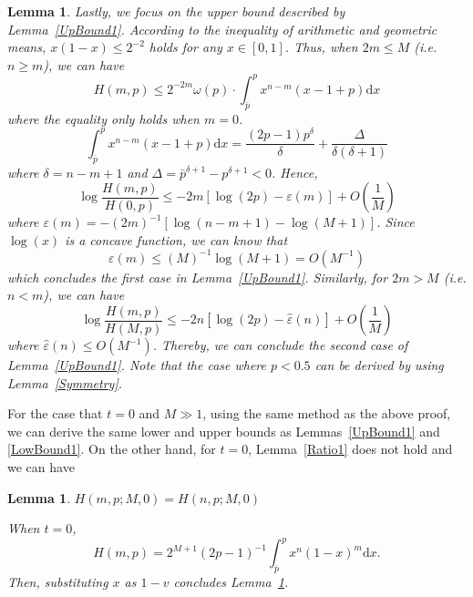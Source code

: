 \documentclass{article}
\makeatletter
\newcounter{lemmas}
\newtheorem{lemma}[lemmas]{Lemma}
\renewenvironment{proof}[1][\proofname]{\par
  \vspace{-\topsep}%
  \pushQED{\qed}%
  \normalfont
  \topsep0pt \partopsep0pt %
  \trivlist
  \item[\hskip\labelsep
        \itshape
    #1\@addpunct{.}]\ignorespaces
}{%
  \popQED\endtrivlist\@endpefalse
  \addvspace{0pt plus 0pt} %
}
\makeatother
\begin{document}
\begin{lemma}
\begin{proof}
Lastly, we focus on the upper bound described by Lemma~\ref{UpBound1}. According to the inequality of arithmetic and geometric means, $x(1-x)\leq 2^{-2}$ holds for any $x\in [0,1]$. Thus, when $2m\leq M$ (i.e. $n\geq m$), we can have
\begin{equation}
H(m,p)\leq 2^{-2m}\omega(p)\cdot \int_{\bar{p}}^{p}x^{n-m}(x-1+p)\mathrm{d}x
\end{equation}
where the equality only holds when $m=0$.
\begin{equation}
 \int_{\bar{p}}^{p}x^{n-m}(x-1+p)\mathrm{d}x=\frac{(2p-1)p^{\delta}}{\delta}+\frac{\Delta}{\delta(\delta+1)}
\end{equation}
where $\delta=n-m+1$ and $\Delta=\bar{p}^{\delta+1}-p^{\delta+1}<0$. Hence,
\begin{equation}
\log\frac{H(m,p)}{H(0,p)}\leq -2m[\log(2p)-\varepsilon(m)] + O\left(\frac{1}{M}\right)
\end{equation}
where $\varepsilon(m)=-(2m)^{-1}[\log(n-m+1)-\log(M+1)]$. Since $\log(x)$ is a concave function, we can know that
\begin{equation}
\varepsilon(m)\leq (M)^{-1}\log(M+1)=O\left(M^{-1}\right)
\end{equation}
which concludes the first case in Lemma~\ref{UpBound1}. Similarly, for $2m>M$ (i.e. $n<m$), we can have
\begin{equation}
\log\frac{H(m,p)}{H(M,p)}\leq -2n[\log(2p)-\hat{\varepsilon}(n)] + O\left(\frac{1}{M}\right)
\end{equation}
where $\hat{\varepsilon}(n)\leq O(M^{-1})$. Thereby, we can conclude the second case of Lemma~\ref{UpBound1}. Note that the case where $p<0.5$ can be derived by using Lemma~\ref{Symmetry}.
\end{proof}
\end{lemma}
For the case that $t=0$ and $M\gg 1$, using the same method as the above proof, we can derive the same lower and upper bounds as Lemmas~\ref{UpBound1} and \ref{LowBound1}. On the other hand, for $t=0$, Lemma~\ref{Ratio1} does not hold and we can have
\begin{lemma}
\label{Ratio0}
$H(m,p;M,0)=H(n,p;M,0)$
\begin{proof}
When $t=0$,
\begin{equation}
H(m,p)=2^{M+1}(2p-1)^{-1}\int_{\bar{p}}^{p}x^n(1-x)^m\mathrm{d}x.
\end{equation}
Then, substituting $x$ as $1-v$ concludes Lemma~\ref{Ratio0}.
\end{proof}
\end{lemma}
\end{document}
